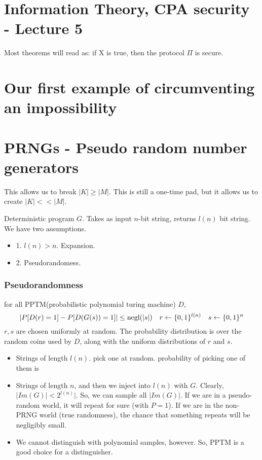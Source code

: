 \section{Information Theory, CPA security - Lecture 5}


Most theorems will read as: if X is true, then the protocol $\Pi$ is secure.

\section{Our first example of circumventing an impossibility}

\section{PRNGs - Pseudo random number generators}
This allows us to break $|K| \geq |M|$.
This is still a one-time pad, but it allows us to create $|K| << |M|$.


Deterministic program $G$.  Takes as input $n$-bit string, returns $l(n)$ bit string. We have two
assumptions.
\begin{itemize}
\item 1. $l(n) > n$. Expansion.
\item 2. Pseudorandomess.
\end{itemize}

\subsubsection{Pseudorandomness}
for all PPTM(probabilistic polynomial turing machine) $D$,
$$ |P[D(r) = 1] - P[D(G(s)) = 1]| \leq \operatorname{negl}(|s|) \quad  r \leftarrow \{0, 1\}^{l(n)} \quad  s \leftarrow \{0, 1\}^n$$
$r, s$ are chosen uniformly at random. The probability distribution is over the
random coins used by $D$, along with the uniform distributions of $r$ and $s$.


\begin{itemize}
\item Strings of length $l(n)$. pick one at random. probability of picking one of them is
\item Strings of length $n$, and then we inject into $l(n)$ with $G$. Clearly, $|Im(G)| < 2^{l(n)}|$.
So, we can sample all $|Im(G)|$. If we are in a pseudo-random world, it will repeat for sure (with $P = 1$).
If we are in the non-PRNG world (true randomness), the chance that something repeats will be negligibly small.
\item We cannot distinguish with polynomial samples, however. So, PPTM is a good choice for a distinguisher.
\end{itemize}


